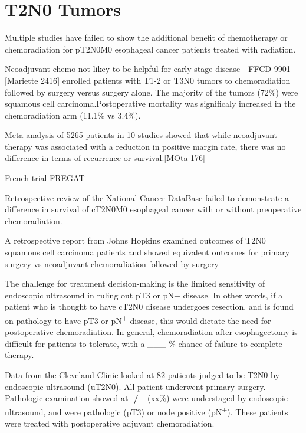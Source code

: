 \documentclass[
]{book}
\begin{document}
\hypertarget{t2n0-tumors}{%
\chapter{T2N0 Tumors}\label{t2n0-tumors}}

Multiple studies have failed to show the additional benefit of chemotherapy or chemoradiation for pT2N0M0 esophageal cancer patients treated with radiation.

Neoadjuvant chemo not likey to be helpful for early stage disease - FFCD 9901 {[}Mariette 2416{]} enrolled patients with T1-2 or T3N0 tumors to chemoradiation followed by surgery versus surgery alone. The majority of the tumors (72\%) were squamous cell carcinoma.Postoperative mortality was significaly increased in the chemoradiation arm (11.1\% vs 3.4\%).

Meta-analysis of 5265 patients in 10 studies showed that while neoadjuvant therapy was associated with a reduction in positive margin rate, there was no difference in terms of recurrence or survival.{[}MOta 176{]}

French trial FREGAT\citep{markar59}

Retrospective review of the National Cancer DataBase failed to demonstrate a difference in survival of cT2N0M0 esophageal cancer with or without preoperative chemoradiation.\citep{speicher1195}

A retrospective report from Johns Hopkins examined outcomes of T2N0 squamous cell carcinoma patients and showed equivalent outcomes for primary surgery vs neoadjuvant chemoradiation followed by surgery \citep{zhang429}

The challenge for treatment decision-making is the limited sensitivity of endoscopic ultrasound in ruling out pT3 or pN+ disease. In other words, if a patient who is thought to have cT2N0 disease undergoes resection, and is found on pathology to have pT3 or pN\textsuperscript{+} disease, this would dictate the need for postoperative chemoradiation. In general, chemoradiation after esophagectomy is difficult for patients to tolerate, with a \_\_\_ \% chance of failure to complete therapy.

Data from the Cleveland Clinic looked at 82 patients judged to be T2N0 by endoscopic ultrasound (uT2N0). All patient underwent primary surgery. Pathologic examination showed at -\textbf{/}\_ (xx\%) were understaged by endoscopic ultrasound, and were pathologic (pT3) or node positive (pN\textsuperscript{+}). These patients were treated with postoperative adjuvant chemoradiation.\citep{rice}
\end{document}

